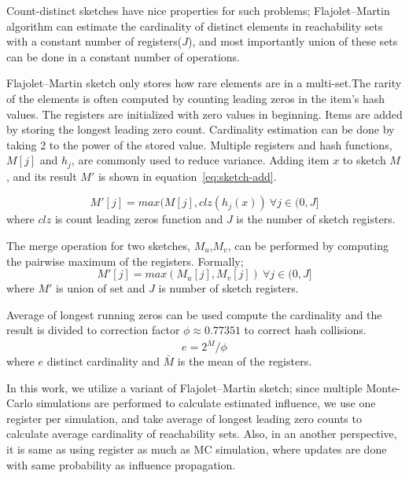 \documentclass[10pt,journal,compsoc]{IEEEtran}
\begin{document}
Count-distinct sketches have nice properties for such problems; Flajolet–Martin algorithm\cite{flajolet1985probabilistic} can estimate the cardinality of distinct elements in reachability sets with a constant number of registers($J$), and most importantly union of these sets can be done in a constant number of operations.


Flajolet–Martin sketch only stores how rare elements are in a multi-set.The rarity of the elements is often computed by counting leading zeros in the item's hash values.  The registers are initialized with zero values in beginning. Items are added by storing the longest leading zero count. Cardinality estimation can be done by taking 2 to the power of the stored value. Multiple registers and hash functions, $M[j]$ and $h_j$, are commonly used to reduce variance.
Adding item $x$ to sketch $M$, and its result $M'$ is shown in equation~\ref{eq:sketch-add}.

\begin{equation}
    \label{eq:sketch-add}
    M'[j] = max(M[j],clz(h_j(x)) ~ \forall j\in(0,J]
\end{equation} where $clz$ is count leading zeros function and $J$ is the number of sketch registers.

The merge operation for two sketches, $M_u$,$M_v$, can be performed by computing the pairwise maximum of the registers. Formally; 
\begin{equation}
    \label{eq:sketch-merge}
    M'[j] = max(M_u[j],M_v[j]) ~ \forall j\in(0,J]
\end{equation} 
where $M'$ is union of set and $J$ is number of sketch registers.

Average of longest running zeros can be used compute the cardinality and the result is divided to correction factor $\phi \approx 0.77351$ to correct hash collisions.
\begin{equation}
    \label{eq:sketch-estimate}
    e = 2^{\bar{M}}/\phi
\end{equation} 
where $e$ distinct cardinality and $\bar{M}$ is the mean of the registers.

In this work, we utilize a variant of Flajolet–Martin sketch; since multiple Monte-Carlo simulations are performed to calculate estimated influence, we use one register per simulation, and take average of longest leading zero counts to calculate average cardinality of reachability sets. Also, in an another perspective, it is same as using register as much as MC simulation, where updates are done with same probability as influence propagation. 
\end{document}
